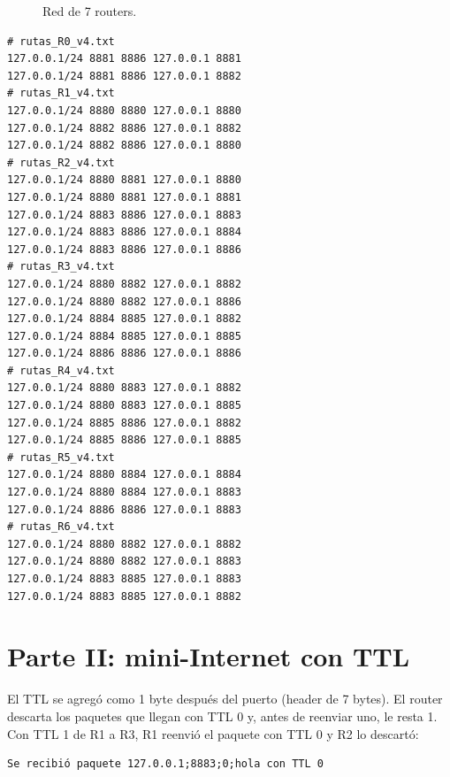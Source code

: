 \documentclass[11pt,letterpaper]{article}
\begin{document}
\begin{figure}[H]
\centering
{}
\caption{Red de 7 routers.}
\label{fig:v4}
\end{figure}

\begin{lstlisting}
# rutas_R0_v4.txt
127.0.0.1/24 8881 8886 127.0.0.1 8881
127.0.0.1/24 8881 8886 127.0.0.1 8882
# rutas_R1_v4.txt
127.0.0.1/24 8880 8880 127.0.0.1 8880
127.0.0.1/24 8882 8886 127.0.0.1 8882
127.0.0.1/24 8882 8886 127.0.0.1 8880
# rutas_R2_v4.txt
127.0.0.1/24 8880 8881 127.0.0.1 8880
127.0.0.1/24 8880 8881 127.0.0.1 8881
127.0.0.1/24 8883 8886 127.0.0.1 8883
127.0.0.1/24 8883 8886 127.0.0.1 8884
127.0.0.1/24 8883 8886 127.0.0.1 8886
# rutas_R3_v4.txt
127.0.0.1/24 8880 8882 127.0.0.1 8882
127.0.0.1/24 8880 8882 127.0.0.1 8886
127.0.0.1/24 8884 8885 127.0.0.1 8882
127.0.0.1/24 8884 8885 127.0.0.1 8885
127.0.0.1/24 8886 8886 127.0.0.1 8886
# rutas_R4_v4.txt
127.0.0.1/24 8880 8883 127.0.0.1 8882
127.0.0.1/24 8880 8883 127.0.0.1 8885
127.0.0.1/24 8885 8886 127.0.0.1 8882
127.0.0.1/24 8885 8886 127.0.0.1 8885
# rutas_R5_v4.txt
127.0.0.1/24 8880 8884 127.0.0.1 8884
127.0.0.1/24 8880 8884 127.0.0.1 8883
127.0.0.1/24 8886 8886 127.0.0.1 8883
# rutas_R6_v4.txt
127.0.0.1/24 8880 8882 127.0.0.1 8882
127.0.0.1/24 8880 8882 127.0.0.1 8883
127.0.0.1/24 8883 8885 127.0.0.1 8883
127.0.0.1/24 8883 8885 127.0.0.1 8882
\end{lstlisting}

\section{Parte II: mini-Internet con TTL}

El TTL se agregó como 1 byte después del puerto (header de 7 bytes). El router descarta
los paquetes que llegan con TTL 0 y, antes de reenviar uno, le resta 1. Con TTL 1 de R1 a
R3, R1 reenvió el paquete con TTL 0 y R2 lo descartó:

\begin{lstlisting}
Se recibió paquete 127.0.0.1;8883;0;hola con TTL 0
\end{lstlisting}
\end{document}
